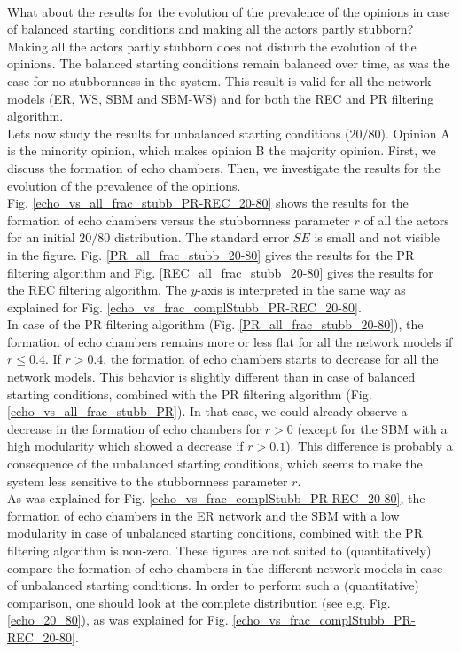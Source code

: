 \documentclass[11 pt , letterpaper , twoside , openright]{book}
\begin{document}
\\
\newline
What about the results for the evolution of the prevalence of the opinions in case of balanced starting conditions and making all the actors partly stubborn? Making all the actors partly stubborn does not disturb the evolution of the opinions. The balanced starting conditions remain balanced over time, as was the case for no stubbornness in the system. This result is valid for all the network models (ER, WS, SBM and SBM-WS) and for both the REC and PR filtering algorithm.\\
\newline
Lets now study the results for unbalanced starting conditions ($20/80$). Opinion A is the minority opinion, which makes opinion B the majority opinion. First, we discuss the formation of echo chambers. Then, we investigate the results for the evolution of the prevalence of the opinions.\\
\newline
Fig. \ref{echo_vs_all_frac_stubb_PR-REC_20-80} shows the results for the formation of echo chambers versus the stubbornness parameter $r$ of all the actors for an initial $20/80$ distribution. The standard error $SE$ is small and not visible in the figure. Fig. \ref{PR_all_frac_stubb_20-80} gives the results for the PR filtering algorithm and Fig. \ref{REC_all_frac_stubb_20-80} gives the results for the REC filtering algorithm. The $y$-axis is interpreted in the same way as explained for Fig. \ref{echo_vs_frac_complStubb_PR-REC_20-80}.\\
\newline
In case of the PR filtering algorithm (Fig. \ref{PR_all_frac_stubb_20-80}), the formation of echo chambers remains more or less flat for all the network models if $r \leqslant 0.4$. If $r > 0.4$, the formation of echo chambers starts to decrease for all the network models. This behavior is slightly different than in case of balanced starting conditions, combined with the PR filtering algorithm (Fig. \ref{echo_vs_all_frac_stubb_PR}). In that case, we could already observe a decrease in the formation of echo chambers for $r > 0$ (except for the SBM with a high modularity which showed a decrease if $r>0.1$). This difference is probably a consequence of the unbalanced starting conditions, which seems to make the system less sensitive to the stubbornness parameter $r$.\\
\newline
As was explained for Fig. \ref{echo_vs_frac_complStubb_PR-REC_20-80}, the formation of echo chambers in the ER network and the SBM with a low modularity in case of unbalanced starting conditions, combined with the PR filtering algorithm is non-zero. These figures are not suited to (quantitatively) compare the formation of echo chambers in the different network models in case of unbalanced starting conditions. In order to perform such a (quantitative) comparison, one should look at the complete distribution (see e.g. Fig. \ref{echo_20_80}), as was explained for Fig. \ref{echo_vs_frac_complStubb_PR-REC_20-80}.
\end{document}
